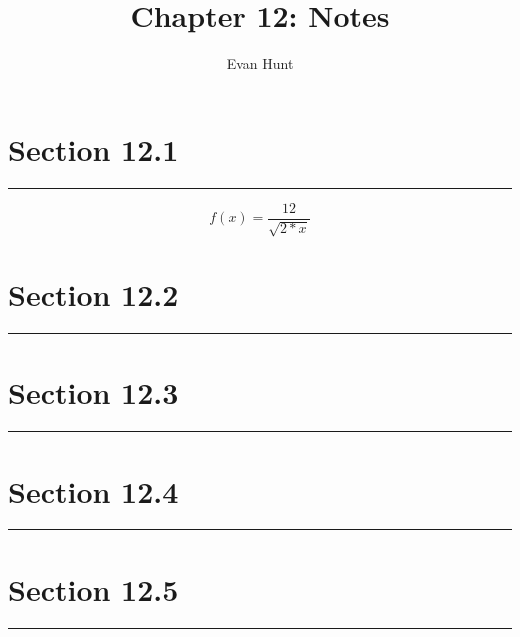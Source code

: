 \documentclass[12pt]{article}
\title{Chapter 12: Notes}
\author{Evan Hunt}
\begin{document}
    \maketitle

    \section[]{Section 12.1}
    \noindent\rule{\textwidth}{0.4pt}
        \begin{equation}
            f(x) = \frac{12}{\sqrt{2*x}}
        \end{equation}
    \section[]{Section 12.2}
    \noindent\rule{\textwidth}{0.4pt}
    \section[]{Section 12.3}
    \noindent\rule{\textwidth}{0.4pt}
    \section[]{Section 12.4}
    \noindent\rule{\textwidth}{0.4pt}
    \section[]{Section 12.5}
    \noindent\rule{\textwidth}{0.4pt}
\end{document}
